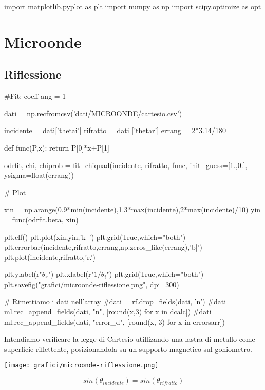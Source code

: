 \begin{sagesilent}
import matplotlib.pyplot as plt
import numpy as np
import scipy.optimize as opt
\end{sagesilent}


\chapter{Microonde}

\section{Riflessione}
\begin{sagesilent}
#Fit: coeff ang = 1

dati = np.recfromcsv('dati/MICROONDE/cartesio.csv')

incidente = dati['thetai']
rifratto = dati ['thetar']
errang = 2*3.14/180

def func(P,x):
    return P[0]*x+P[1]

odrfit, chi, chiprob = fit_chiquad(incidente, rifratto, func, init_guess=[1.,0.], ysigma=float(errang))


# Plot

xin = np.arange(0.9*min(incidente),1.3*max(incidente),2*max(incidente)/10)
yin = func(odrfit.beta, xin)

plt.clf()
plt.plot(xin,yin,'k--')
plt.grid(True,which="both")
plt.errorbar(incidente,rifratto,errang,np.zeros_like(errang),'b|')
plt.plot(incidente,rifratto,'r.')

plt.ylabel(r"$\theta_r$")
plt.xlabel(r"$1/\theta_i$")
plt.grid(True,which="both")
plt.savefig("grafici/microonde-riflessione.png", dpi=300)


# Rimettiamo i dati nell'array
#dati = rf.drop_fields(dati, 'n')
#dati = ml.rec_append_fields(dati, "n", [round(x,3) for x in dcalc])
#dati = ml.rec_append_fields(dati, "error_d", [round(x, 3) for x in errorsarr])

\end{sagesilent}


Intendiamo verificare la legge di Cartesio utillizando una lastra di metallo come superficie riflettente, posizionandola su un supporto magnetico sul goniometro.

\texttt{[image: grafici/microonde-riflessione.png]}

\begin{equation}
sin(\theta_{incidente}) = sin(\theta_{rifratto})
\end{equation}

